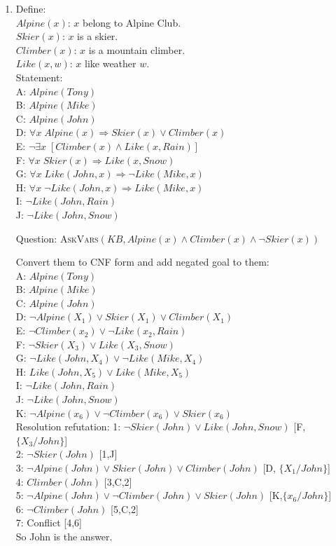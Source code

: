 \documentclass{article}
\begin{document}
\begin{enumerate}
\item Define:\\
 $Alpine(x)$: $x$ belong to Alpine Club. \\
 $Skier(x)$: $x$ is a skier. \\
 $Climber(x)$: $x$ is a mountain climber. \\
 $Like(x,w)$: $x$ like weather $w$. \\

 Statement: \\
 A: $Alpine(Tony)$ \\
 B: $Alpine(Mike)$ \\
 C: $Alpine(John)$ \\
 D: $\forall x \; Alpine(x) \Rightarrow Skier(x)\lor Climber(x)$ \\
 E: $\neg\exists x \; [Climber(x) \land Like(x,Rain)]$ \\
 F: $\forall x \; Skier(x) \Rightarrow Like(x,Snow)$ \\
 G: $\forall x \; Like(John,x) \Rightarrow \neg Like(Mike,x)$ \\
 H: $\forall x \; \neg Like(John,x) \Rightarrow Like(Mike,x)$ \\
 I: $\neg Like(John,Rain)$ \\
 J: $\neg Like(John,Snow)$

 Question: \textsc{AskVars}$(KB, Alpine(x)\land Climber(x)\land \neg Skier(x))$

 Convert them to CNF form and add negated goal to them: \\
 A: $Alpine(Tony)$ \\
 B: $Alpine(Mike)$ \\
 C: $Alpine(John)$ \\
 D: $\neg Alpine(X_1) \lor Skier(X_1)\lor Climber(X_1)$ \\
 E: $\neg Climber(x_2) \lor \neg Like(x_2,Rain)$ \\
 F: $\neg Skier(X_3) \lor Like(X_3,Snow)$ \\
 G: $\neg Like(John,X_4) \lor \neg Like(Mike,X_4)$ \\
 H: $Like(John,X_5) \lor Like(Mike,X_5)$ \\
 I: $\neg Like(John,Rain)$ \\
 J: $\neg Like(John,Snow)$ \\
 K: $\neg Alpine(x_6)\lor \neg Climber(x_6)\lor Skier(x_6)$ \\

 Resolution refutation:
 1: $\neg Skier(John) \lor Like(John,Snow)$ [F, $\{X_3/John\}$] \\
 2: $\neg Skier(John)$ [1,J] \\
 3: $\neg Alpine(John) \lor Skier(John)\lor Climber(John)$ [D, $\{X_1/John\}$] \\
 4: $Climber(John)$ [3,C,2] \\
 5: $\neg Alpine(John)\lor \neg Climber(John)\lor Skier(John)$ [K,$\{x_6/John\}$] \\
 6: $\neg Climber(John)$ [5,C,2] \\
 7: Conflict [4,6] \\
 So John is the answer.


\end{enumerate}
\end{document}

